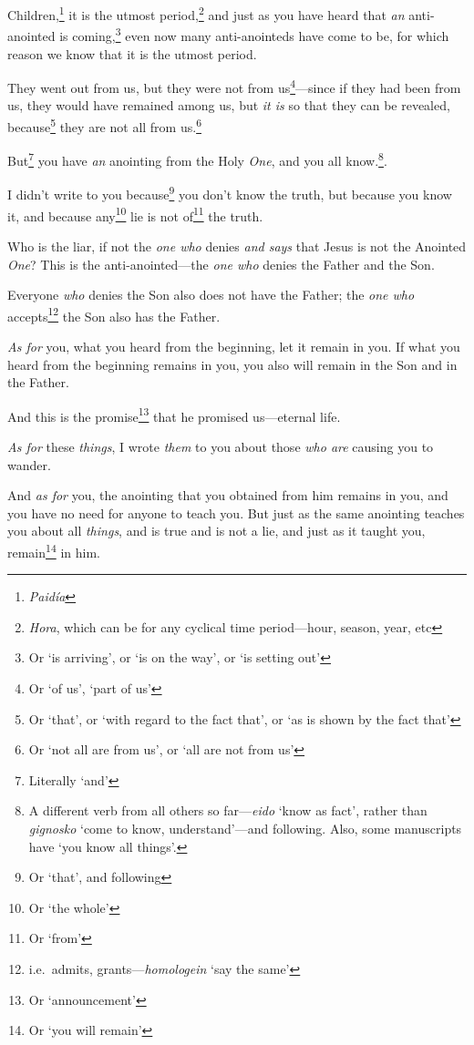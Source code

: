 \documentclass[article]{memoir}%
\newcounter{vnum}
\newcommand{\vnum}{%
	\textsuperscript{\thevnum}%
	\addtocounter{vnum}{1}%
}
\newcommand{\infer}[1]{\textit{#1}}
\newcommand{\lx}[1]{\textit{#1}}
\newcommand{\lxx}[2]{\textit{#1} `#2'}
\begin{document}
\vnum Children,\footnote{\lx{Paidía}} it is the utmost period,\footnote{\lx{Hora}, which can be for any cyclical time period---hour, season, year, etc} and just as you have heard that \infer{an} anti-anointed is coming,\footnote{Or `is arriving', or `is on the way', or `is setting out'} even now many anti-anointeds have come to be, for which reason we know that it is the utmost period. \vnum They went out from us, but they were not from us\footnote{Or `of us', `part of us'}---since if they had been from us, they would have remained among us, but \infer{it is} so that they can be revealed, because\footnote{Or `that', or `with regard to the fact that', or `as is shown by the fact that'} they are not all from us.\footnote{Or `not all are from us', or `all are not from us'} \vnum But\footnote{Literally `and'} you have \infer{an} anointing from the Holy \infer{One}, and you all know.\footnote{A different verb from all others so far---\lxx{eido}{know as fact}, rather than \lxx{gignosko}{come to know, understand}---and following. Also, some manuscripts have `you know all things'.}. \vnum I didn't write to you because\footnote{Or `that', and following} you don't know the truth, but because you know it, and because any\footnote{Or `the whole'} lie is not of\footnote{Or `from'} the truth. \vnum Who is the liar, if not the \infer{one who} denies \infer{and says} that Jesus is not the Anointed \infer{One}? This is the anti-anointed---the \infer{one who} denies the Father and the Son. \vnum Everyone \infer{who} denies the Son also does not have the Father; the \infer{one who} accepts\footnote{i.e.\ admits, grants---\lxx{homologein}{say the same}} the Son also has the Father. \vnum \infer{As for} you, what you heard from the beginning, let it remain in you. If what you heard from the beginning remains in you, you also will remain in the Son and in the Father. \vnum And this is the promise\footnote{Or `announcement'} that he promised us---eternal life.

\vnum \infer{As for} these \infer{things}, I wrote \infer{them} to you about those \infer{who are} causing you to wander. \vnum And \infer{as for} you, the anointing that you obtained from him remains in you, and you have no need for anyone to teach you.	But just as the same anointing teaches you about all \infer{things}, and is true and is not a lie, and just as it taught you, remain\footnote{Or `you will remain'} in him.
\end{document}
